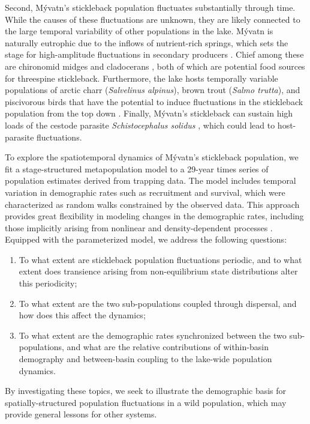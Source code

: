 Second, M\'{y}vatn's stickleback population fluctuates substantially through time.
While the causes of these fluctuations are unknown, 
they are likely connected to the large temporal variability 
of other populations in the lake.
M\'{y}vatn is naturally eutrophic due to the inflows of nutrient-rich springs,
which sets the stage for high-amplitude fluctuations in secondary producers
\citep{einarsson2004myvatn}.
Chief among these are chironomid midges and cladocerans
\citep{einarsson2002, einarsson2004clad, gardarsson2004population, ives2008},
both of which are potential food sources for threespine stickleback.
Furthermore, the lake hosts temporally variable populations 
of arctic charr (\emph{Salvelinus alpinus}), 
brown trout (\emph{Salmo trutta}), 
and piscivorous birds that have the potential 
to induce fluctuations in the stickleback population from the top down
\citep{einarsson2004moulting, gudbergsson2004}.
Finally, M\'{y}vatn's stickleback can sustain high loads of the cestode parasite
\emph{Schistocephalus solidus} \citep{gislason1998, karvonen2013},
which could lead to host-parasite fluctuations.

To explore the spatiotemporal dynamics of M\'{y}vatn's stickleback population, 
we fit a stage-structured metapopulation model \citep{caswell2001matrix}
to a 29-year times series of population estimates derived from trapping data.
The model includes temporal variation in demographic rates such as recruitment and survival,
which were characterized as random walks constrained by the observed data.
This approach provides great flexibility in modeling changes in the demographic rates,
including those implicitly arising from nonlinear and density-dependent processes
\citep{zeng1998, ives2012}.
Equipped with the parameterized model, we address the following questions:
%
\begin{enumerate}[label=(\alph*)]
\item
To what extent are stickleback population fluctuations periodic, 
and to what extent does transience arising from non-equilibrium state distributions
alter this periodicity;
%
\item
To what extent are the two sub-populations coupled through dispersal,
and how does this affect the dynamics; 
%
\item
To what extent are the demographic rates synchronized between the two sub-populations,
and what are the relative contributions of within-basin demography 
and between-basin coupling to the lake-wide population dynamics.
\end{enumerate}
%
By investigating these topics, 
we seek to illustrate the demographic basis for spatially-structured population fluctuations
in a wild population, 
which may provide general lessons for other systems. 